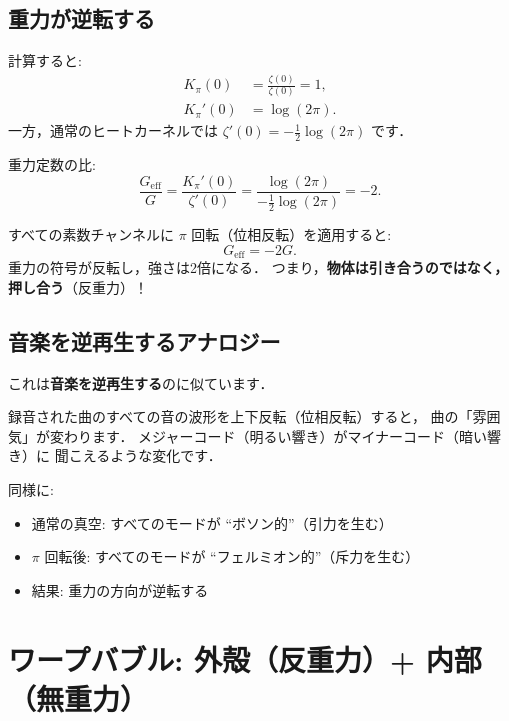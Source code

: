 \documentclass[11pt,a4paper]{article}
\begin{document}
\subsection{重力が逆転する}

計算すると:
\begin{align}
  K_\pi(0) &= \frac{\zeta(0)}{\zeta(0)} = 1, \\
  K_\pi'(0) &= \log(2\pi).
\end{align}
一方，通常のヒートカーネルでは
$\zeta'(0) = -\frac{1}{2}\log(2\pi)$ です．

重力定数の比:
\begin{equation}
  \frac{G_{\text{eff}}}{G}
  = \frac{K_\pi'(0)}{\zeta'(0)}
  = \frac{\log(2\pi)}{-\frac{1}{2}\log(2\pi)}
  = -2.
\end{equation}

\begin{tcolorbox}[colback=purple!5,colframe=purple!50!black,title=定理2: 重力逆転]
すべての素数チャンネルに $\pi$ 回転（位相反転）を適用すると:
\[
  G_{\text{eff}} = -2G.
\]
重力の符号が反転し，強さは2倍になる．
つまり，\textbf{物体は引き合うのではなく，押し合う}（反重力）！
\end{tcolorbox}

\subsection{音楽を逆再生するアナロジー}

これは\textbf{音楽を逆再生する}のに似ています．

録音された曲のすべての音の波形を上下反転（位相反転）すると，
曲の「雰囲気」が変わります．
メジャーコード（明るい響き）がマイナーコード（暗い響き）に
聞こえるような変化です．

同様に:
\begin{itemize}
  \item 通常の真空: すべてのモードが ``ボソン的''（引力を生む）
  \item $\pi$ 回転後: すべてのモードが ``フェルミオン的''（斥力を生む）
  \item 結果: 重力の方向が逆転する
\end{itemize}

\section{ワープバブル: 外殻（反重力）+ 内部（無重力）}
\end{document}
